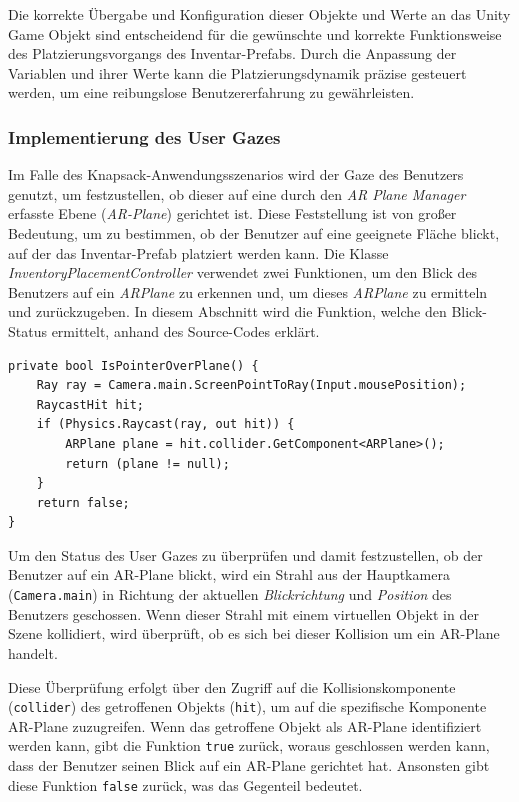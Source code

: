 Die korrekte Übergabe und Konfiguration dieser Objekte und Werte an das Unity Game Objekt sind entscheidend für die
gewünschte und korrekte Funktionsweise des Platzierungsvorgangs des Inventar-Prefabs. Durch die Anpassung der Variablen
und ihrer Werte kann die Platzierungsdynamik präzise gesteuert werden, um eine reibungslose Benutzererfahrung zu gewährleisten.

\subsubsection{Implementierung des User Gazes}
Im Falle des Knapsack-Anwendungsszenarios wird der Gaze des Benutzers genutzt, um festzustellen, ob dieser auf eine durch
den \textit{AR Plane Manager} erfasste Ebene (\textit{AR-Plane}) gerichtet ist. Diese Feststellung ist von großer Bedeutung,
um zu bestimmen, ob der Benutzer auf eine geeignete Fläche blickt, auf der das Inventar-Prefab platziert werden kann.
Die Klasse \textit{InventoryPlacementController} verwendet zwei Funktionen, um den Blick des Benutzers auf ein \textit{ARPlane}
zu erkennen und, um dieses \textit{ARPlane} zu ermitteln und zurückzugeben. In diesem Abschnitt wird die Funktion, welche
den Blick-Status ermittelt, anhand des Source-Codes erklärt.
\begin{lstlisting}[caption={Funktion zur Überprüfung des User Gazes}, label=code:isPOP]
private bool IsPointerOverPlane() {
    Ray ray = Camera.main.ScreenPointToRay(Input.mousePosition);
    RaycastHit hit;
    if (Physics.Raycast(ray, out hit)) {
        ARPlane plane = hit.collider.GetComponent<ARPlane>();
        return (plane != null);
    }
    return false;
}
\end{lstlisting}
Um den Status des User Gazes zu überprüfen und damit festzustellen, ob der Benutzer auf ein AR-Plane blickt, wird ein
Strahl aus der Hauptkamera (\texttt{Camera.main}) in Richtung der aktuellen \textit{Blickrichtung} und \textit{Position}
des Benutzers geschossen. Wenn dieser Strahl mit einem virtuellen Objekt in der Szene kollidiert, wird überprüft, ob es
sich bei dieser Kollision um ein AR-Plane handelt.

Diese Überprüfung erfolgt über den Zugriff auf die Kollisionskomponente (\texttt{collider}) des getroffenen Objekts
(\texttt{hit}), um auf die spezifische Komponente AR-Plane zuzugreifen. Wenn das getroffene Objekt als AR-Plane identifiziert
werden kann, gibt die Funktion \texttt{true} zurück, woraus geschlossen werden kann, dass der Benutzer seinen Blick auf
ein AR-Plane gerichtet hat. Ansonsten gibt diese Funktion \texttt{false} zurück, was das Gegenteil bedeutet.

